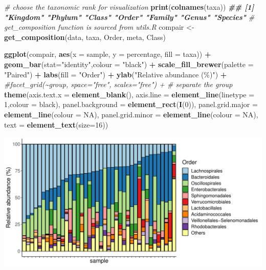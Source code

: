 \documentclass[
]{article}
\newenvironment{Shaded}{\begin{snugshade}}{\end{snugshade}}
\newcommand{\AttributeTok}[1]{\textcolor[rgb]{0.13,0.29,0.53}{#1}}
\newcommand{\CommentTok}[1]{\textcolor[rgb]{0.56,0.35,0.01}{\textit{#1}}}
\newcommand{\ConstantTok}[1]{\textcolor[rgb]{0.56,0.35,0.01}{#1}}
\newcommand{\DecValTok}[1]{\textcolor[rgb]{0.00,0.00,0.81}{#1}}
\newcommand{\DocumentationTok}[1]{\textcolor[rgb]{0.56,0.35,0.01}{\textbf{\textit{#1}}}}
\newcommand{\FunctionTok}[1]{\textcolor[rgb]{0.13,0.29,0.53}{\textbf{#1}}}
\newcommand{\NormalTok}[1]{#1}
\newcommand{\OtherTok}[1]{\textcolor[rgb]{0.56,0.35,0.01}{#1}}
\newcommand{\SpecialCharTok}[1]{\textcolor[rgb]{0.81,0.36,0.00}{\textbf{#1}}}
\newcommand{\StringTok}[1]{\textcolor[rgb]{0.31,0.60,0.02}{#1}}
\begin{document}
\begin{Shaded}
\begin{Highlighting}[]
\CommentTok{\# choose the taxonomic rank for visualization}
\FunctionTok{print}\NormalTok{(}\FunctionTok{colnames}\NormalTok{(taxa))}
\DocumentationTok{\#\# [1] "Kingdom" "Phylum"  "Class"   "Order"   "Family"  "Genus"   "Species"}
\CommentTok{\# get\_composition function is sourced from utils.R}
\NormalTok{compair }\OtherTok{\textless{}{-}} \FunctionTok{get\_composition}\NormalTok{(data, taxa, }\StringTok{\textquotesingle{}Order\textquotesingle{}}\NormalTok{, meta, }\StringTok{\textquotesingle{}Class\textquotesingle{}}\NormalTok{)}

\FunctionTok{ggplot}\NormalTok{(compair, }\FunctionTok{aes}\NormalTok{(}\AttributeTok{x =}\NormalTok{ sample, }\AttributeTok{y =}\NormalTok{ percentage, }\AttributeTok{fill =}\NormalTok{ taxa)) }\SpecialCharTok{+} 
  \FunctionTok{geom\_bar}\NormalTok{(}\AttributeTok{stat=}\StringTok{"identity"}\NormalTok{,}\AttributeTok{colour =} \StringTok{"black"}\NormalTok{) }\SpecialCharTok{+} \FunctionTok{scale\_fill\_brewer}\NormalTok{(}\AttributeTok{palette =} \StringTok{"Paired"}\NormalTok{) }\SpecialCharTok{+}
  \FunctionTok{labs}\NormalTok{(}\AttributeTok{fill =} \StringTok{"Order"}\NormalTok{) }\SpecialCharTok{+} \FunctionTok{ylab}\NormalTok{(}\StringTok{"Relative abundance (\%)"}\NormalTok{) }\SpecialCharTok{+} 
  \CommentTok{\#facet\_grid(\textasciitilde{}group, space="free", scales="free") + \# separate the group}
  \FunctionTok{theme}\NormalTok{(}\AttributeTok{axis.text.x =} \FunctionTok{element\_blank}\NormalTok{(),}
        \AttributeTok{axis.line =} \FunctionTok{element\_line}\NormalTok{(}\AttributeTok{linetype =} \DecValTok{1}\NormalTok{,}\AttributeTok{colour =} \StringTok{\textquotesingle{}black\textquotesingle{}}\NormalTok{),}
        \AttributeTok{panel.background =} \FunctionTok{element\_rect}\NormalTok{(}\FunctionTok{I}\NormalTok{(}\DecValTok{0}\NormalTok{)),}
        \AttributeTok{panel.grid.major =} \FunctionTok{element\_line}\NormalTok{(}\AttributeTok{colour =} \ConstantTok{NA}\NormalTok{),}
        \AttributeTok{panel.grid.minor =} \FunctionTok{element\_line}\NormalTok{(}\AttributeTok{colour =} \ConstantTok{NA}\NormalTok{),}
        \AttributeTok{text =} \FunctionTok{element\_text}\NormalTok{(}\AttributeTok{size=}\DecValTok{16}\NormalTok{))}
\end{Highlighting}
\end{Shaded}

\includegraphics{workshop_files/figure-latex/unnamed-chunk-24-1.pdf}
\end{document}

